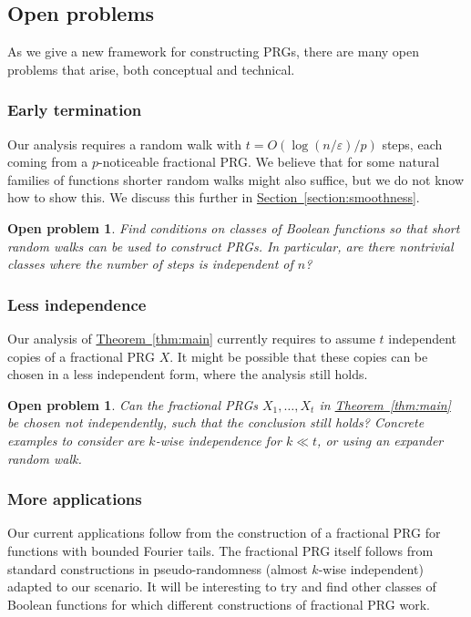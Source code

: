 \documentclass[11pt]{article}
\numberwithin{equation}{section}
\theoremstyle{definition}
\theoremstyle{plain}
\newcommand{\expref}[2]{\hyperref[#2]{#1~\ref{#2}}}
\newcommand{\eps}{\varepsilon}
\newtheorem{open}[theorem]{Open problem}
\begin{document}
\subsection{Open problems}
As we give a new framework for constructing PRGs,
there are many open problems that arise, both conceptual and technical.

\subsubsection{Early termination}
Our analysis requires a random walk with $t=O(\log(n/\eps)/p)$ steps, each coming from a $p$-noticeable fractional PRG\@.
We believe that for some natural families of functions shorter random walks might also suffice, but we do not
know how to show this. We discuss this further in \expref{Section}{section:smoothness}.


\begin{open}
\label{open:early_termination}
Find conditions on classes of Boolean functions so that short random walks can be used to construct PRGs.
In particular, are there nontrivial classes where the number of steps is independent of $n$?
\end{open}

\subsubsection{Less independence}
Our analysis of \expref{Theorem}{thm:main} currently requires to assume $t$ independent copies of a fractional PRG $X$. It might be possible that these copies can be chosen in a less independent form, where the analysis still holds.

\begin{open}
Can the fractional PRGs $X_1,\ldots,X_t$ in \expref{Theorem}{thm:main} be chosen not independently, such that the conclusion still holds? Concrete examples to consider are $k$-wise independence for $k \ll t$, or using an expander random walk.
\end{open}


\subsubsection{More applications}
Our current applications follow from the construction of a fractional PRG for functions with bounded Fourier tails.
The fractional PRG itself follows from standard constructions in pseudo-randomness (almost $k$-wise independent)
adapted to our scenario. It will be interesting to try and find other classes of Boolean functions for which different constructions of fractional PRG work.
\end{document}
